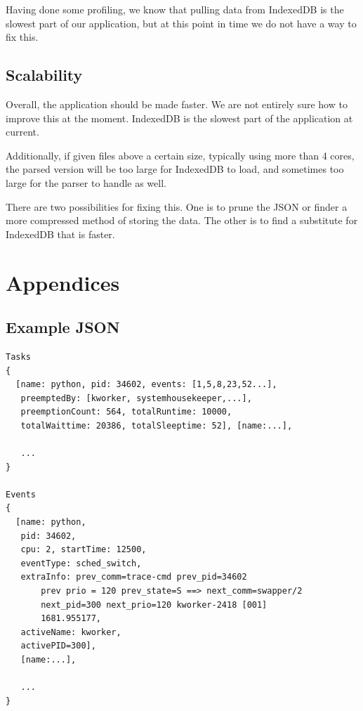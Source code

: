 \documentclass{hmcclinic}
\begin{document}
Having done some profiling, we know that pulling data from IndexedDB is the
slowest part of our application, but at this point in time we do not have a way
to fix this.

\section{Scalability}
  Overall, the application should be made faster. We are not entirely sure how
  to improve this at the moment. IndexedDB is the slowest part of the
  application at current.

Additionally, if given files above a certain size, typically using more than 4
cores, the parsed version will be too large for IndexedDB to load, and
sometimes too large for the parser to handle as well.

There are two possibilities for fixing this. One is to prune the JSON or
finder a more compressed method of storing the data. The other is to find a
substitute for IndexedDB that is faster.


\chapter{Appendices}
\newpage
\appendix
\renewcommand{\thesection}{\Alph{section}}
\section{Example JSON} \label{App:AppendixA}

\begin{verbatim}
Tasks
{
  [name: python, pid: 34602, events: [1,5,8,23,52...], 
   preemptedBy: [kworker, systemhousekeeper,...], 
   preemptionCount: 564, totalRuntime: 10000,
   totalWaittime: 20386, totalSleeptime: 52], [name:...],

   ...   
}

Events
{
  [name: python, 
   pid: 34602, 
   cpu: 2, startTime: 12500, 
   eventType: sched_switch,
   extraInfo: prev_comm=trace-cmd prev_pid=34602 
       prev prio = 120 prev_state=S ==> next_comm=swapper/2 
       next_pid=300 next_prio=120 kworker-2418 [001]
       1681.955177, 
   activeName: kworker, 
   activePID=300], 
   [name:...], 

   ...
}
\end{verbatim}
\end{document}
